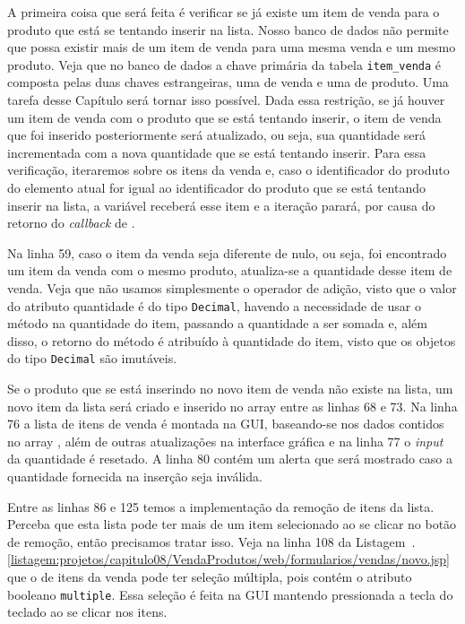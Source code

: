 A primeira coisa que será feita é verificar se já existe um item de venda para o produto que está se tentando inserir na lista. Nosso banco de dados não permite que possa existir mais de um item de venda para uma mesma venda e um mesmo produto. Veja que no banco de dados a chave primária da tabela \texttt{item\_venda} é composta pelas duas chaves estrangeiras, uma de venda e uma de produto. Uma tarefa desse Capítulo será tornar isso possível. Dada essa restrição, se já houver um item de venda com o produto que se está tentando inserir, o item de venda que foi inserido posteriormente será atualizado, ou seja, sua quantidade será incrementada com a nova quantidade que se está tentando inserir. Para essa verificação, iteraremos sobre os itens da venda e, caso o identificador do produto do elemento atual for igual ao identificador do produto que se está tentando inserir na lista, a variável  receberá esse item e a iteração parará, por causa do retorno  do \textit{callback} de .

Na linha 59, caso o item da venda seja diferente de nulo, ou seja, foi encontrado um item da venda com o mesmo produto, atualiza-se a quantidade desse item de venda. Veja que não usamos simplesmente o operador de adição, visto que o valor do atributo quantidade é do tipo \texttt{Decimal}, havendo a necessidade de usar o método  na quantidade do item, passando a quantidade a ser somada e, além disso, o retorno do método é atribuído à quantidade do item, visto que os objetos do tipo \texttt{Decimal} são imutáveis.

Se o produto que se está inserindo no novo item de venda não existe na lista, um novo item da lista será criado e inserido no array entre as linhas 68 e 73. Na linha 76 a lista de itens de venda é montada na GUI, baseando-se nos dados contidos no array , além de outras atualizações na interface gráfica e na linha 77 o \textit{input} da quantidade é resetado. A linha 80 contém um alerta que será mostrado caso a quantidade fornecida na inserção seja inválida.

Entre as linhas 86 e 125 temos a implementação da remoção de itens da lista. Perceba que esta lista pode ter mais de um item selecionado ao se clicar no botão de remoção, então precisamos tratar isso. Veja na linha 108 da Listagem~\thechapter.\ref{listagem:projetos/capitulo08/VendaProdutos/web/formularios/vendas/novo.jsp} que o  de itens da venda pode ter seleção múltipla, pois contém o atributo booleano \texttt{multiple}. Essa seleção é feita na GUI mantendo pressionada a tecla  do teclado ao se clicar nos itens.

